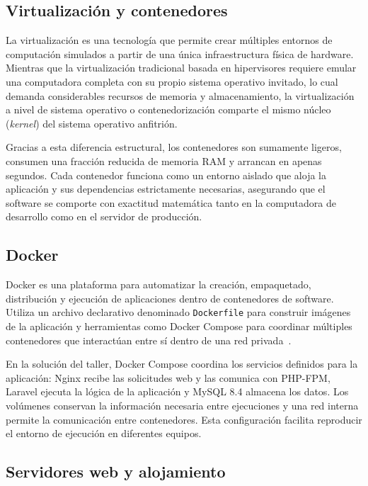 \subsection{Virtualización y contenedores}

La virtualización es una tecnología que permite crear múltiples entornos de computación simulados a partir de una única infraestructura física de hardware. Mientras que la virtualización tradicional basada en hipervisores requiere emular una computadora completa con su propio sistema operativo invitado, lo cual demanda considerables recursos de memoria y almacenamiento, la virtualización a nivel de sistema operativo o contenedorización comparte el mismo núcleo (\textit{kernel}) del sistema operativo anfitrión.

Gracias a esta diferencia estructural, los contenedores son sumamente ligeros, consumen una fracción reducida de memoria RAM y arrancan en apenas segundos. Cada contenedor funciona como un entorno aislado que aloja la aplicación y sus dependencias estrictamente necesarias, asegurando que el software se comporte con exactitud matemática tanto en la computadora de desarrollo como en el servidor de producción.

\subsection{Docker}

Docker es una plataforma para automatizar la creación, empaquetado, distribución y ejecución de aplicaciones dentro de contenedores de software. Utiliza un archivo declarativo denominado \texttt{Dockerfile} para construir imágenes de la aplicación y herramientas como Docker Compose para coordinar múltiples contenedores que interactúan entre sí dentro de una red privada~\cite{docker_php}.

En la solución del taller, Docker Compose coordina los servicios definidos para la aplicación: Nginx recibe las solicitudes web y las comunica con PHP-FPM, Laravel ejecuta la lógica de la aplicación y MySQL 8.4 almacena los datos. Los volúmenes conservan la información necesaria entre ejecuciones y una red interna permite la comunicación entre contenedores. Esta configuración facilita reproducir el entorno de ejecución en diferentes equipos.

\subsection{Servidores web y alojamiento}

